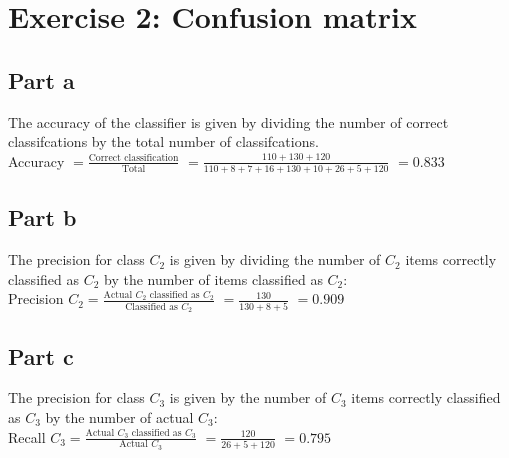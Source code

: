 \documentclass[a4paper, 10pt]{article}
\begin{document}
\section{Exercise 2: Confusion matrix}
\subsection{Part a}
The accuracy of the classifier is given by dividing the number of correct classifcations
by the total number of classifcations.
\\
Accuracy $=\frac{\text{Correct classification}}{\text{Total}}$
         $=\frac{110+130+120}{110+8+7+16+130+10+26+5+120}$
         $= 0.833$
          
\subsection{Part b}

The precision for class $C_2$ is given by dividing the number of $C_2$ items correctly classified 
as $C_2$ by the number of items classified as $C_2$:
\\
Precision $C_2 =\frac{\text{Actual }C_2\text{ classified as }C_2 }{\text{Classified as }C_2}$
             $=\frac{130}{130+8+5}$ 
             $=0.909$

\subsection{Part c}

The precision for class $C_3$ is given by the number of $C_3$ items correctly classified 
as $C_3$ by the number of actual $C_3$:
\\
Recall $C_3 =\frac{\text{Actual }C_3\text{ classified as }C_3 }{\text{Actual }C_3}$
          $=\frac{120}{26+5+120}$
          $=0.795$
\end{document}

